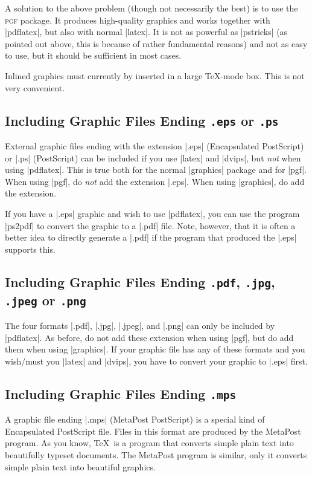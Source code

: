 A solution to the above problem (though not necessarily the best) is
to use the \textsc{pgf} package. It produces high-quality graphics and
works together with |pdflatex|, but also with normal
|latex|. It is not as powerful as |pstricks| (as pointed
out above, this is because of rather fundamental reasons) and not as
easy to use, but it should be sufficient in most cases.

\lyxnote
Inlined graphics must currently by inserted in a large \TeX-mode
box. This is not very convenient.


\subsection{Including Graphic Files Ending \texttt{.eps} or \texttt{.ps}}

External graphic files ending with the extension |.eps| (Encapsulated
PostScript) or |.ps| (PostScript) can be included if you use |latex|
and |dvips|, but \emph{not} when using |pdflatex|. This is true
both for the normal |graphics| package and for |pgf|. When using
|pgf|, do \emph{not} add the extension |.eps|. When using
|graphics|, do add the extension.

If you have a |.eps| graphic and wish to use |pdflatex|, you can use
the program |ps2pdf| to convert the graphic to a |.pdf| file. Note,
however, that it is often a better idea to directly generate a |.pdf|
if the program that produced the |.eps| supports this.


\subsection{Including Graphic Files Ending \texttt{.pdf},
  \texttt{.jpg}, \texttt{.jpeg} or \texttt{.png}}

The four formats |.pdf|, |.jpg|, |.jpeg|, and |.png| can only be
included by |pdflatex|. As before, do not add these extension when
using |pgf|, but do add them when using |graphics|. If your graphic
file has any of these formats and you wish/must you |latex| and
|dvips|, you  have to convert your graphic to |.eps| first.


\subsection{Including Graphic Files Ending \texttt{.mps}}

A graphic file ending |.mps| (MetaPost PostScript) is a special kind
of Encapsulated PostScript file. Files in this format are produced by
the MetaPost program. As you know, \TeX\ is a program that converts
simple plain text into beautifully typeset documents. The MetaPost
program is similar, only it converts simple plain text into beautiful
graphics.

